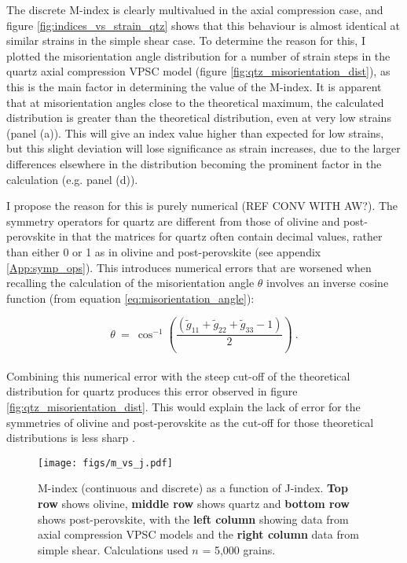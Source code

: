\documentclass[a4paper,12pt,twoside]{report}
\numberwithin{equation}{chapter}
\begin{document}
The discrete M-index is clearly multivalued in the axial compression case, and figure \ref{fig:indices_vs_strain_qtz} shows that this behaviour is almost identical at similar strains in the simple shear case. To determine the reason for this, I plotted the misorientation angle distribution for a number of strain steps in the quartz axial compression VPSC model (figure \ref{fig:qtz_misorientation_dist}), as this is the main factor in determining the value of the M-index. It is apparent that at misorientation angles close to the theoretical maximum, the calculated distribution is greater than the theoretical distribution, even at very low strains (panel (a)). This will give an index value higher than expected for low strains, but this slight deviation will lose significance as strain increases, due to the larger differences elsewhere in the distribution becoming the prominent factor in the calculation (e.g. panel (d)).

I propose the reason for this is purely numerical (REF CONV WITH AW?). The symmetry operators for quartz are different from those of olivine and post-perovskite in that the matrices for quartz often contain decimal values, rather than either 0 or 1 as in olivine and post-perovskite (see appendix \ref{App:symp_ops}). This introduces numerical errors that are worsened when recalling the calculation of the misorientation angle $\theta$ involves an inverse cosine function (from equation \ref{eq:misorientation_angle}):   

\begin{equation}
\theta\ =\ \cos^{-1}\left( \frac{(\tilde{g}_{11} + \tilde{g}_{22} + \tilde{g}_{33} - 1)}{2} \right)\ .
\end{equation}
\\
Combining this numerical error with the steep cut-off of the theoretical distribution for quartz produces this error observed in figure \ref{fig:qtz_misorientation_dist}. This would explain the lack of error for the symmetries of olivine and post-perovskite as the cut-off for those theoretical distributions is less sharp \citep[see figure \ref{fig:misorientation_example}, or][for more distributions]{Wheeler2001}.

\begin{figure*}[p]
  \centering
    \texttt{[image: figs/m\_vs\_j.pdf]}
  \caption[Relationship of M- and J-indices]{M-index (continuous and discrete) as a function of J-index. \textbf{Top row} shows olivine, \textbf{middle row} shows quartz and \textbf{bottom row} shows post-perovskite, with the \textbf{left column} showing data from axial compression VPSC models and the \textbf{right column} data from simple shear. Calculations used $n$ = 5,000 grains.} 
  \label{fig:m_vs_j}
\end{figure*} 
  
\end{document}
